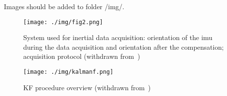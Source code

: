 Images should be added to folder /img/.


\begin{figure*} 
\centering
    \texttt{[image: ./img/fig2.png]}
  \caption{System used for inertial
    data acquisition: orientation of the \gls{imu} during the data acquisition
    and orientation after the compensation; acquisition protocol (withdrawn from~\cite{cav-enunc})}%
\label{fig:fig2}
\end{figure*}

\begin{figure}
\centering
    \texttt{[image: ./img/kalmanf.png]}
  \caption{KF procedure overview (withdrawn from~\cite{mccarron2013low})}%
\label{fig:kalmanf}
\end{figure}


